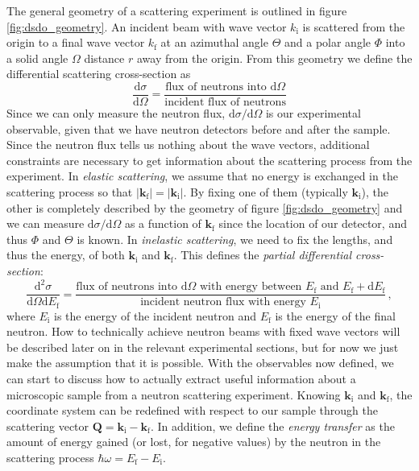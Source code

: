 The general geometry of a scattering experiment is outlined in figure \ref{fig:dsdo_geometry}. An incident beam with wave vector $k_\text{i}$ is scattered from the origin to a final wave vector $k_\text{f}$ at an azimuthal angle $\Theta$ and a polar angle $\Phi$ into a solid angle $\Omega$ distance $r$ away from the origin. From this geometry we define the differential scattering cross-section as
%
\[ \frac{\mathrm{d} \sigma}{\mathrm{d}\Omega} = \frac{\text{flux of neutrons into } \mathrm{d}\Omega}{\text{incident flux of neutrons}} \]
%
Since we can only measure the neutron flux, $\mathrm{d}\sigma / \mathrm{d}\Omega$ is our experimental observable, given that we have neutron detectors before and after the sample. Since the neutron flux tells us nothing about the wave vectors, additional constraints are necessary to get information about the scattering process from the experiment. In \emph{elastic scattering}, we assume that no energy is exchanged in the scattering process so that $|\bm{k}_\text{f}| = |\bm{k}_\text{i}|$. By fixing one of them (typically $\bm{k}_\text{i}$), the other is completely described by the geometry of figure \ref{fig:dsdo_geometry} and we can measure $\mathrm{d}\sigma / \mathrm{d}\Omega$ as a function of $\bm{k}_\text{f}$ since the location of our detector, and thus $\Phi$ and $\Theta$ is known. In \emph{inelastic scattering}, we need to fix the lengths, and thus the energy, of both $\bm{k}_\text{i}$ and $\bm{k}_\text{f}$. This defines the \emph{partial differential cross-section}:
%
\[ \frac{\mathrm{d}^2 \sigma}{\mathrm{d}\Omega \mathrm{d}E_\text{f}} = \frac{\text{flux of neutrons into } \mathrm{d}\Omega \text{ with energy between } E_\text{f} \text{ and } E_\text{f} + \mathrm{d}E_\text{f}}{\text{incident neutron flux with energy } E_\text{i}} \, , \]
%
where $E_\text{i}$ is the energy of the incident neutron and $E_\text{f}$ is the energy of the final neutron. How to technically achieve neutron beams with fixed wave vectors will be described later on in the relevant experimental sections, but for now we just make the assumption that it is possible. With the observables now defined, we can start to discuss how to actually extract useful information about a microscopic sample from a neutron scattering experiment. Knowing $\bm{k}_\text{i}$ and $\bm{k}_\text{f}$, the coordinate system can be redefined with respect to our sample through the scattering vector $\bm{Q} = \bm{k}_\text{i} - \bm{k}_\text{f}$. In addition, we define the \emph{energy transfer} as the amount of energy gained (or lost, for negative values) by the neutron in the scattering process $\hbar \omega = E_\text{f} - E_\text{i}$.

